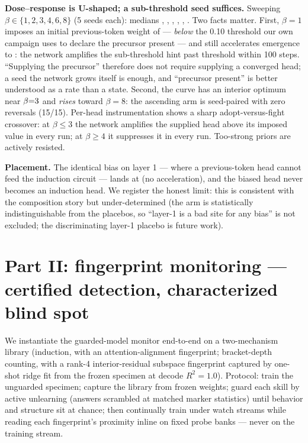 \documentclass[11pt]{article}
\begin{document}
\textbf{Dose--response is U-shaped; a sub-threshold seed suffices.} Sweeping
$\beta \in \{1,2,3,4,6,8\}$ (5 seeds each): medians
\PsevenDoseAMed, \PsevenDoseBMed, \PsevenDoseCMed, \PsevenDoseDMed,
\PsevenDoseEMed, \PsevenHardMed. Two facts matter. First, $\beta{=}1$ imposes an
initial previous-token weight of \PsevenDoseAPv{} --- \emph{below} the 0.10 threshold
our own campaign uses to declare the precursor present --- and still accelerates
emergence to \PsevenDoseAMed: the network amplifies the sub-threshold hint past
threshold within 100 steps. ``Supplying the precursor'' therefore does not require
supplying a converged head; a seed the network grows itself is enough, and
``precursor present'' is better understood as a rate than a state. Second, the curve
has an interior optimum near $\beta{=}3$ and \emph{rises} toward
$\beta{=}8$: the ascending arm is seed-paired with zero reversals (15/15). Per-head
instrumentation shows a sharp adopt-versus-fight crossover: at $\beta\le3$ the
network amplifies the supplied head above its imposed value in every run; at
$\beta\ge4$ it suppresses it in every run. Too-strong priors are actively resisted.

\textbf{Placement.} The identical bias on layer 1 --- where a previous-token head
cannot feed the induction circuit --- lands at \PsevenHardLOneMed{} (no
acceleration), and the biased head never becomes an induction head. We register the
honest limit: this is consistent with the composition story but under-determined
(the arm is statistically indistinguishable from the placebos, so ``layer-1 is a bad
site for any bias'' is not excluded; the discriminating layer-1 placebo is future
work).

\section{Part II: fingerprint monitoring --- certified detection, characterized blind spot}
\label{sec:p8pilot}
We instantiate the guarded-model monitor end-to-end on a two-mechanism library
(induction, with an attention-alignment fingerprint; bracket-depth counting, with a
rank-4 interior-residual subspace fingerprint captured by one-shot ridge fit from the
frozen specimen at decode $R^2{=}1.0$). Protocol: train the unguarded specimen;
capture the library from frozen weights; guard each skill by active unlearning
(answers scrambled at matched marker statistics) until behavior and structure sit at
chance; then continually train under watch streams while reading each fingerprint's
proximity inline on fixed probe banks --- never on the training stream.
\end{document}

